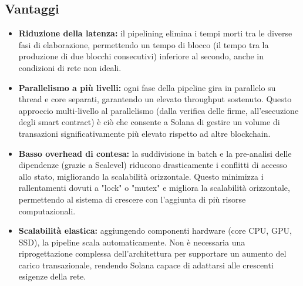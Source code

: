 \documentclass[a4paper,12pt]{report}
\begin{document}
	\subsection{Vantaggi}
	\begin{itemize}
		\item \textbf{Riduzione della latenza:} il pipelining elimina i tempi morti tra le diverse fasi di elaborazione, permettendo un tempo di blocco (il tempo tra la produzione di due blocchi consecutivi) inferiore al secondo, anche in condizioni di rete non ideali.
		\item \textbf{Parallelismo a più livelli:} ogni fase della pipeline gira in parallelo su thread e core separati, garantendo un elevato throughput sostenuto. Questo approccio multi-livello al parallelismo (dalla verifica delle firme, all'esecuzione degli smart contract) è ciò che consente a Solana di gestire un volume di transazioni significativamente più elevato rispetto ad altre blockchain.
		\item \textbf{Basso overhead di contesa:} la suddivisione in batch e la pre-analisi delle dipendenze (grazie a Sealevel) riducono drasticamente i conflitti di accesso allo stato, migliorando la scalabilità orizzontale. Questo minimizza i rallentamenti dovuti a "lock" o "mutex" e migliora la scalabilità orizzontale, permettendo al sistema di crescere con l'aggiunta di più risorse computazionali.
		\item \textbf{Scalabilità elastica:} aggiungendo componenti hardware (core CPU, GPU, SSD), la pipeline scala automaticamente. Non è necessaria una riprogettazione complessa dell'architettura per supportare un aumento del carico transazionale, rendendo Solana capace di adattarsi alle crescenti esigenze della rete.
	\end{itemize}
	
\end{document}
